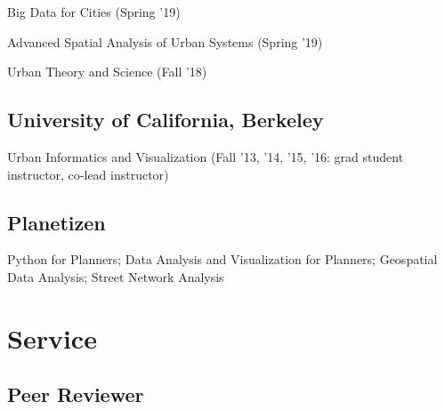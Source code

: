 \documentclass[12pt,letterpaper]{report}
\newcommand{\listitemspace}{0.15em}
\renewenvironment{itemize}
{\begin{list}{}{\setlength{\leftmargin}{0em}
			\setlength{\parskip}{0em}
			\setlength{\itemsep}{\listitemspace}
			\setlength{\parsep}{\listitemspace}}}
	{\end{list}}
\begin{document}
	\begin{itemize}
		
		\item Big Data for Cities (Spring '19)
		
		\item Advanced Spatial Analysis of Urban Systems (Spring '19)
		
		\item Urban Theory and Science (Fall '18)
		
	\end{itemize}
	
	\subsection*{University of California, Berkeley}
	
	\begin{itemize}
		
		\item Urban Informatics and Visualization (Fall '13, '14, '15, '16: grad student instructor, co-lead instructor)
		
	\end{itemize}
	
	\subsection*{Planetizen}
	
	\begin{itemize}
		
		\item Python for Planners; Data Analysis and Visualization for Planners; Geospatial Data Analysis; Street Network Analysis
		
	\end{itemize}
	
	
	\section*{Service}
	
	\subsection*{Peer Reviewer}
	
\end{document}
